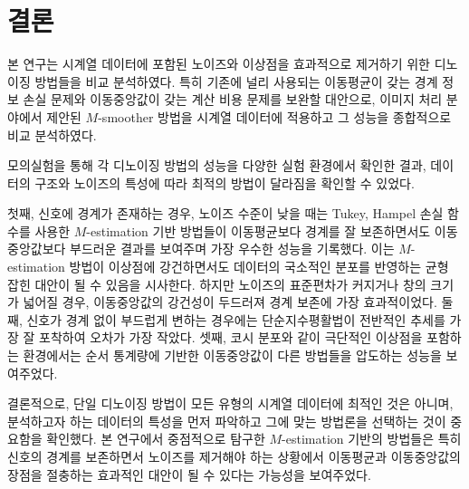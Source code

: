 \documentclass[letterpaper,12pt]{article}
\begin{document}
{\section{결론}\label{sec:discuss}
본 연구는 시계열 데이터에 포함된 노이즈와 이상점을 효과적으로 제거하기 위한 디노이징 방법들을 비교 분석하였다. 특히 기존에 널리 사용되는 이동평균이 갖는 경계 정보 손실 문제와 이동중앙값이 갖는 계산 비용 문제를 보완할 대안으로, 이미지 처리 분야에서 제안된 $M$-smoother 방법을 시계열 데이터에 적용하고 그 성능을 종합적으로 비교 분석하였다.


%
모의실험을 통해 각 디노이징 방법의 성능을 다양한 실험 환경에서 확인한 결과, 데이터의 구조와 노이즈의 특성에 따라 최적의 방법이 달라짐을 확인할 수 있었다.
%

%
첫째, 신호에 경계가 존재하는 경우, 노이즈 수준이 낮을 때는 Tukey, Hampel 손실 함수를 사용한 $M$-estimation 기반 방법들이 이동평균보다 경계를 잘 보존하면서도 이동중앙값보다 부드러운 결과를 보여주며 가장 우수한 성능을 기록했다. 이는 $M$-estimation 방법이 이상점에 강건하면서도 데이터의 국소적인 분포를 반영하는 균형 잡힌 대안이 될 수 있음을 시사한다. 하지만 노이즈의 표준편차가 커지거나 창의 크기가 넓어질 경우, 이동중앙값의 강건성이 두드러져 경계 보존에 가장 효과적이었다. 둘째, 신호가 경계 없이 부드럽게 변하는 경우에는 단순지수평활법이 전반적인 추세를 가장 잘 포착하여 오차가 가장 작았다. 셋째, 코시 분포와 같이 극단적인 이상점을 포함하는 환경에서는 순서 통계량에 기반한 이동중앙값이 다른 방법들을 압도하는 성능을 보여주었다.
%

결론적으로, 단일 디노이징 방법이 모든 유형의 시계열 데이터에 최적인 것은 아니며, 분석하고자 하는 데이터의 특성을 먼저 파악하고 그에 맞는 방법론을 선택하는 것이 중요함을 확인했다. 본 연구에서 중점적으로 탐구한 $M$-estimation 기반의 방법들은 특히 신호의 경계를 보존하면서 노이즈를 제거해야 하는 상황에서 이동평균과 이동중앙값의 장점을 절충하는 효과적인 대안이 될 수 있다는 가능성을 보여주었다.






\clearpage







\newpage
\thispagestyle{empty}
\begin{center}
\vspace{3.5cm}
\fontsize{14}{10} \selectfont{Comparative study on denoising methods for time series\\}
\vspace{1.5cm}
\fontsize{12}{10} \selectfont{Donghyeok Kim\\}
\vspace{1cm}
\fontsize{11}{10} \selectfont{Department of Statistics\\
The Graduate School\\
Pusan National University\\}
\vspace{1.5cm}
\fontsize{12}{10} \selectfont{Abstract\\}
\vspace{-\baselineskip}
\end{center}

}
\end{document}
